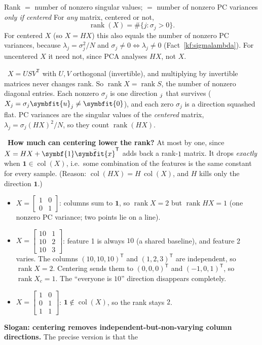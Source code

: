 \documentclass[11pt]{article}
\newcommand{\bm}[1]{\symbfit{#1}}
\newcounter{keyfact}
\newcommand{\why}{\par\smallskip{\color{intgreen}\textbf{Why.}}\ }
\newcommand{\sowhat}{\par\smallskip{\color{corpurple}\textbf{So what.}}\ }
\let\vv\relax\newcommand{\vv}{\bm{v}}
\newcommand{\vu}{\bm{u}}
\newcommand{\one}{\symbf{1}}
\newcommand{\xbar}{\bar{\bm{x}}}
\newcommand{\T}{^{\mathsf T}}
\newcommand{\rank}{\operatorname{rank}}
\newcommand{\col}{\operatorname{col}}
\begin{document}
\begin{keyfactbox}{Rank $=$ number of nonzero singular values; $=$ number of nonzero PC variances \emph{only if centered}}\label{kf:rankcount}
For \emph{any} matrix, centered or not,
\[
\boxed{\rank(X)=\#\{j:\sigma_j>0\}.}
\]
For centered $X$ (so $X=HX$) this also equals the number of nonzero PC variances, because
$\lambda_j=\sigma_j^2/N$ and $\sigma_j\ne0\iff\lambda_j\ne0$ (Fact~\ref{kf:sigmalambda}). For uncentered $X$ it need not, since PCA
analyses $HX$, not $X$.
\why $X=USV\T$ with $U,V$ orthogonal (invertible), and multiplying by invertible matrices never changes rank. So
$\rank X=\rank S$, the number of nonzero diagonal entries. Each nonzero $\sigma_j$ is one direction $\vv_j$ that
survives ($X\vv_j=\sigma_j\vu_j\ne\bm0$), and each zero $\sigma_j$ is a direction squashed flat. PC variances are the singular
values of the \emph{centered} matrix, $\lambda_j=\sigma_j(HX)^2/N$, so they count $\rank(HX)$.
\sowhat \textbf{How much can centering lower the rank?} At most by one, since $X=HX+\one\xbar\T$ adds back a rank-$1$ matrix.
It drops \emph{exactly} when $\one\in\col(X)$, i.e.\ some combination of the features is the same constant for every
sample. (Reason: $\col(HX)=H\,\col(X)$, and $H$ kills only the direction $\one$.)
\begin{itemize}[nosep]
\item $X=\begin{bmatrix}1&0\\0&1\end{bmatrix}$: columns sum to $\one$, so $\rank X=2$ but $\rank HX=1$ (one nonzero PC variance; two points lie on a line).
\item $X=\begin{bmatrix}10&1\\10&2\\10&3\end{bmatrix}$: feature 1 is always $10$ (a shared baseline), and feature 2 varies. The columns
$(10,10,10)\T$ and $(1,2,3)\T$ are independent, so $\rank X=2$. Centering sends them to $(0,0,0)\T$ and $(-1,0,1)\T$, so
$\rank X_c=1$. The ``everyone is $10$'' direction disappears completely.
\item $X=\begin{bmatrix}1&0\\0&1\\1&1\end{bmatrix}$: $\one\notin\col(X)$, so the rank stays $2$.
\end{itemize}
\textbf{Slogan: centering removes independent-but-non-varying column directions.} The precise version is that the

\end{keyfactbox}
\end{document}
